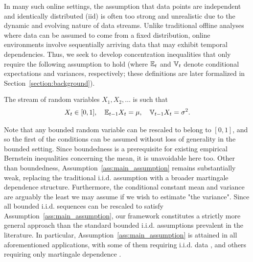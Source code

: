 In many such online settings, the assumption that data points are independent and identically distributed (iid) is often too strong and unrealistic due to the dynamic and evolving nature of data streams. Unlike traditional offline analyses where data can be assumed to come from a fixed distribution, online environments involve sequentially arriving data that may exhibit temporal dependencies. Thus, we seek to develop concentration inequalities that only require the following assumption to hold (where $\mathbb{E}_t$ and $\mathbb{V}_t$ denote conditional expectations and variances, respectively; these definitions are later formalized in Section~\ref{section:background}).
\begin{assumption} \label{ass:main_assumption}
    The stream of random variables $X_1, X_2, \ldots$ is such that
    \begin{align*}
        X_t \in [0,1], \quad \mathbb{E}_{t-1} X_t = \mu, \quad \mathbb{V}_{t-1} X_t = \sigma^2.
    \end{align*}
\end{assumption}

Note that any bounded random variable can be rescaled to belong to $[0,1]$, and so the first of the conditions can be assumed without loss of generality in the bounded setting. Since boundedness is a prerequisite for existing empirical Bernstein inequalities concerning the mean, it is unavoidable here too. Other than boundedness,  Assumption~\ref{ass:main_assumption} remains substantially weak, replacing the traditional i.i.d. assumption with a broader martingale dependence structure. Furthermore, the conditional constant mean and variance are arguably the least we may assume if we wish to estimate "the variance". Since all bounded i.i.d. sequences can be rescaled to satisfy Assumption~\ref{ass:main_assumption}, our framework constitutes a strictly more general approach than the standard bounded i.i.d. assumptions prevalent in the literature. In particular, Assumption~\ref{ass:main_assumption} is attained in all aforementioned applications, with some of them  requiring i.i.d. data \citep{maurer2009empirical, austern2022efficient}, and others requiring only martingale dependence \citep{howard2021time, neopane2025optimistic}.



